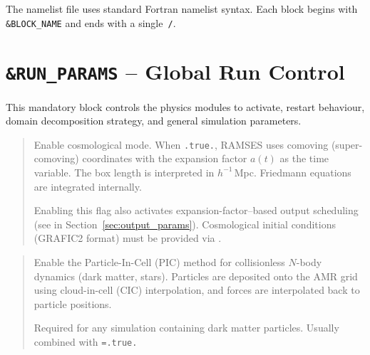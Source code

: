 The namelist file uses standard Fortran namelist syntax.  Each block
begins with \texttt{\&BLOCK\_NAME} and ends with a single~\texttt{/}.

\vspace{0.4cm}
\tableofcontents
\newpage

\section{\texttt{\&RUN\_PARAMS} -- Global Run Control}
\label{sec:run_params}

This mandatory block controls the physics modules to activate, restart
behaviour, domain decomposition strategy, and general simulation
parameters.

\label{param:cosmo}

\begin{quote}
Enable cosmological mode.  When \texttt{.true.}, RAMSES uses comoving
(super-comoving) coordinates with the expansion factor $a(t)$ as the
time variable.  The box length is interpreted in $h^{-1}\,$Mpc.
Friedmann equations are integrated internally.

Enabling this flag also activates expansion-factor--based output
scheduling (see  in
Section~\ref{sec:output_params}).  Cosmological initial conditions
(GRAFIC2 format) must be provided via .
\end{quote}

\label{param:pic}

\begin{quote}
Enable the Particle-In-Cell (PIC) method for collisionless $N$-body
dynamics (dark matter, stars).  Particles are deposited onto the AMR
grid using cloud-in-cell (CIC) interpolation, and forces are
interpolated back to particle positions.

Required for any simulation containing dark matter particles.  Usually
combined with \texttt{=.true.}
\end{quote}

\label{param:poisson}

